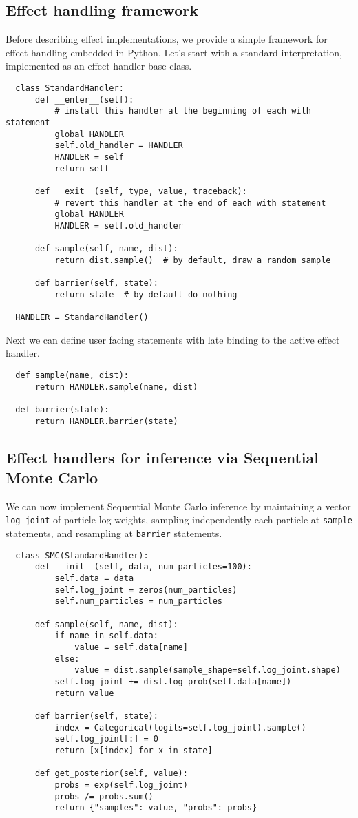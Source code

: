 \documentclass[anonymous=false, %
               format=acmsmall, %
               review=true, %
               screen=true, %
               nonacm=true]{acmart}
\begin{document}
\subsection{Effect handling framework}
Before describing effect implementations, we provide a simple framework for effect handling embedded in Python.
Let's start with a standard interpretation, implemented as an effect handler base class.
\begin{verbatim}
  class StandardHandler:
      def __enter__(self):
          # install this handler at the beginning of each with statement
          global HANDLER
          self.old_handler = HANDLER
          HANDLER = self
          return self

      def __exit__(self, type, value, traceback):
          # revert this handler at the end of each with statement
          global HANDLER
          HANDLER = self.old_handler

      def sample(self, name, dist):
          return dist.sample()  # by default, draw a random sample

      def barrier(self, state):
          return state  # by default do nothing

  HANDLER = StandardHandler()
\end{verbatim}
Next we can define user facing statements with late binding to the active effect handler.
\begin{verbatim}
  def sample(name, dist):
      return HANDLER.sample(name, dist)

  def barrier(state):
      return HANDLER.barrier(state)
\end{verbatim}

\subsection{Effect handlers for inference via Sequential Monte Carlo}
\label{sec:appendix:smc}
We can now implement Sequential Monte Carlo inference by maintaining a vector \verb$log_joint$ of particle log weights, sampling independently each particle at \verb$sample$ statements, and resampling at \verb$barrier$ statements.
\begin{verbatim}
  class SMC(StandardHandler):
      def __init__(self, data, num_particles=100):
          self.data = data
          self.log_joint = zeros(num_particles)
          self.num_particles = num_particles
  
      def sample(self, name, dist):
          if name in self.data:
              value = self.data[name]
          else:
              value = dist.sample(sample_shape=self.log_joint.shape)
          self.log_joint += dist.log_prob(self.data[name])
          return value
  
      def barrier(self, state):
          index = Categorical(logits=self.log_joint).sample()
          self.log_joint[:] = 0
          return [x[index] for x in state]
  
      def get_posterior(self, value):
          probs = exp(self.log_joint)
          probs /= probs.sum()
          return {"samples": value, "probs": probs}
\end{verbatim}
\end{document}
